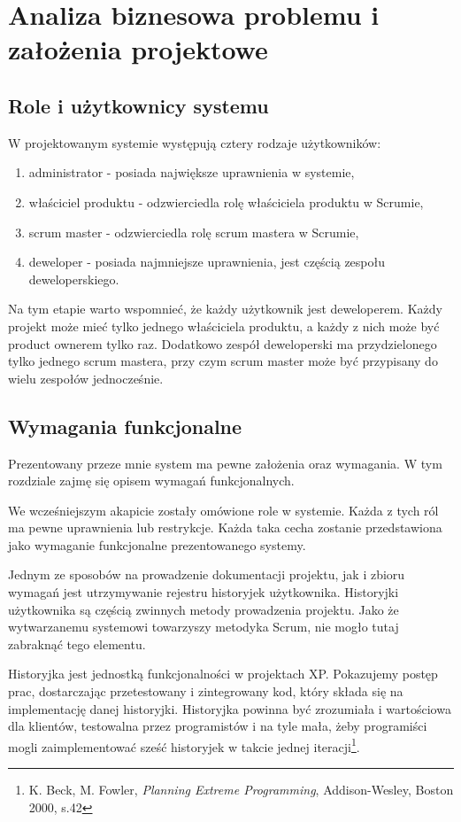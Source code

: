 \chapter{Analiza biznesowa problemu i założenia projektowe}

\section{Role i użytkownicy systemu}
W projektowanym systemie występują cztery rodzaje użytkowników:

\begin{enumerate}
	\item administrator - posiada największe uprawnienia w systemie,
	\item właściciel produktu - odzwierciedla rolę właściciela produktu w Scrumie,
	\item scrum master - odzwierciedla rolę scrum mastera w Scrumie,
	\item deweloper - posiada najmniejsze uprawnienia, jest częścią zespołu deweloperskiego.
\end{enumerate} 

Na tym etapie warto wspomnieć, że każdy użytkownik jest deweloperem. Każdy projekt może mieć tylko jednego właściciela produktu, a każdy z nich może być product ownerem tylko raz. Dodatkowo zespół deweloperski ma przydzielonego tylko jednego scrum mastera, przy czym scrum master może być przypisany do wielu zespołów jednocześnie.

\section{Wymagania funkcjonalne}
Prezentowany przeze mnie system ma pewne założenia oraz wymagania. W tym rozdziale zajmę się opisem wymagań funkcjonalnych. 

We wcześniejszym akapicie zostały omówione role w systemie. Każda z tych ról ma pewne uprawnienia lub restrykcje. Każda taka cecha zostanie przedstawiona jako wymaganie funkcjonalne prezentowanego systemy.

Jednym ze sposobów na prowadzenie dokumentacji projektu, jak i zbioru wymagań jest utrzymywanie rejestru historyjek użytkownika. Historyjki użytkownika są częścią zwinnych metody prowadzenia projektu. Jako że wytwarzanemu systemowi towarzyszy metodyka Scrum, nie mogło tutaj zabraknąć tego elementu.

\begin{italicquote}
	Historyjka jest jednostką funkcjonalności w projektach XP. Pokazujemy postęp prac, dostarczając przetestowany i zintegrowany kod, który składa się na implementację danej historyjki. Historyjka powinna być zrozumiała i wartościowa dla klientów, testowalna przez programistów i na tyle mała, żeby programiści mogli zaimplementować sześć historyjek w takcie jednej iteracji\footnote{K. Beck, M. Fowler, \textit{Planning Extreme Programming}, Addison-Wesley, Boston 2000, s.42}.
\end{italicquote}

